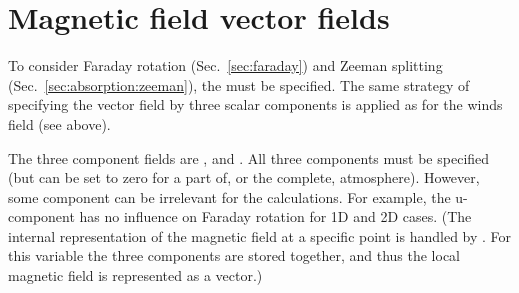 \section{Magnetic field vector fields}
\label{sec:atm:magfields}

To consider Faraday rotation (Sec.~\ref{sec:faraday}) and Zeeman splitting
(Sec.~\ref{sec:absorption:zeeman}), the  must
be specified. The same strategy of specifying the vector field by three scalar
components is applied as for the winds field (see above).

The three component fields are ,
 and . All three components
must be specified (but can be set to zero for a part of, or the complete,
atmosphere). However, some component can be irrelevant for the calculations.
For example, the u-component has no influence on Faraday rotation for 1D and 2D
cases. (The internal representation of the magnetic field at a specific point
is handled by . For this variable the three components are
stored together, and thus the local magnetic field is represented as a vector.)




